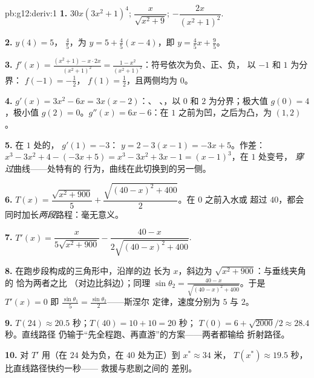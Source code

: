 \begin{solution}{pb:g12:deriv:1}
\textbf{1.} $30x\left(3x^2 + 1\right)^4$; \quad
$\dfrac{x}{\sqrt{x^2 + 9}}$; \quad
$-\dfrac{2x}{\left(x^2 + 1\right)^2}$.

\textbf{2.} $y(4) = 5$， $\frac45$，为
$y = 5 + \frac45(x - 4)$，即 $y = \frac45 x + \frac95$。

\textbf{3.} $f'(x) = \frac{(x^2 + 1) - x \cdot 2x}{(x^2+1)^2}
= \frac{1 - x^2}{(x^2 + 1)^2}$：符号依次为负、正、负，
以 $-1$ 和 $1$ 为分界： $f(-1) = -\frac12$，
$f(1) = \frac12$，且两侧均为 $0$。

\textbf{4.} $g'(x) = 3x^2 - 6x = 3x(x - 2)$：、
、，以 $0$ 和 $2$ 为分界；极大值
$g(0) = 4$，极小值 $g(2) = 0$。$g''(x) = 6x - 6$：在
$1$ 之前为凹，之后为凸，为 $(1, 2)$。

\textbf{5.} 在 $1$ 处的， $g'(1) = -3$：
$y = 2 - 3(x - 1) = -3x + 5$。作差：
$x^3 - 3x^2 + 4 - (-3x + 5) = x^3 - 3x^2 + 3x - 1 =
(x - 1)^3$，在 $1$ 处变号，
\emph{穿过}曲线——处特有的
行为，曲线在此切换到的另一侧。

\textbf{6.} $T(x) = \dfrac{\sqrt{x^2 + 900}}{5} +
\dfrac{\sqrt{(40 - x)^2 + 400}}{2}$。在 $0$ 之前入水或
超过 $40$，都会同时加长\emph{两段}路程：毫无意义。

\textbf{7.} $T'(x) = \dfrac{x}{5\sqrt{x^2 + 900}} -
\dfrac{40 - x}{2\sqrt{(40 - x)^2 + 400}}$.

\textbf{8.} 在跑步段构成的三角形中，沿岸的边
长为 $x$，斜边为 $\sqrt{x^2 + 900}$：与垂线夹角的
恰为两者之比
（对边比斜边）；同理
$\sin\theta_2 = \frac{40 - x}{\sqrt{(40-x)^2 + 400}}$。于是
$T'(x) = 0$ 即
$\frac{\sin\theta_1}{5} = \frac{\sin\theta_2}{2}$——斯涅尔
定律，速度分别为 $5$ 与 $2$。

\textbf{9.} $T(24) \approx 20.5$ 秒；$T(40) = 10 + 10 = 20$ 秒；
$T(0) = 6 + \sqrt{2000}/2 \approx 28.4$ 秒。直线路径
仍输于“先全程跑、再直游”的方案——两者都输给
折射路径。

\textbf{10.} 对 $T'$ 用（在 $24$ 处为负，在
$40$ 处为正）到 $x^* \approx 34$ 米，
$T(x^*) \approx 19.5$ 秒，比直线路径快约一秒——
救援与悲剧之间的
差别。


\end{solution}
